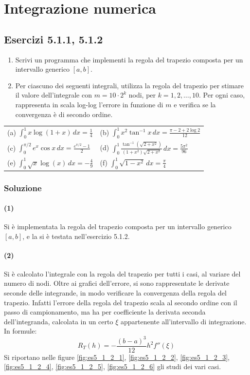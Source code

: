 \documentclass[letterpaper, 12pt]{article}
\numberwithin{equation}{section}    %
\begin{document}
\section{Integrazione numerica}
\subsection{Esercizi 5.1.1, 5.1.2}
\begin{enumerate}
    \item Scrivi un programma che implementi la regola del trapezio composta per un intervallo generico $[a,b]$.
    \item Per ciascuno dei seguenti integrali, utilizza la regola del trapezio per stimare il valore dell'integrale con $m=10\cdot 2^k$ nodi, per $k=1,2,\ldots,10$. Per ogni caso, rappresenta in scala log-log l'errore in funzione di $m$ e verifica se la convergenza è di secondo ordine.
\end{enumerate}

\begin{tabular}{@{}ll@{}}
(a) $\displaystyle \int_0^1 x\log(1+x)\, dx = \frac{1}{4}$
    & (b) $\displaystyle \int_0^1 x^2 \tan^{-1}x\, dx = \frac{\pi-2+2\log 2}{12}$ \\[1.5ex]
(c) $\displaystyle \int_0^{\pi/2}e^x \cos x\, dx = \frac{e^{\pi/2}-1}{2}$
    & (d) $\displaystyle \int_0^1 \frac{\tan^{-1}(\sqrt{2+x^2})}{(1+x^2)\sqrt{2+x^2}}\,dx = \frac{5\pi^2}{96}$ \\[1.5ex]
(e) $\displaystyle \int_0^1 \sqrt{x} \log(x) \, dx = -\frac{4}{9}$ 
    & (f) $\displaystyle \int_0^1 \sqrt{1-x^2}\, dx = \frac{\pi}{4}$ \\ [1.5ex]
\end{tabular}

\subsubsection{Soluzione}
\paragraph{(1)}Si è implementata la regola del trapezio composta per un intervallo generico $[a,b]$,
e la si è testata nell'esercizio 5.1.2.
\paragraph{(2)}Si è calcolato l'integrale con la regola del trapezio per tutti i casi, al variare del numero di
nodi. Oltre ai grafici dell'errore, si sono rappresentate le derivate seconde delle integrande,
in modo verificare la convergenza della regola del trapezio. Infatti l'errore della regola del trapezio 
scala al secondo ordine con il passo di campionamento,
ma ha per coefficiente la derivata seconda dell'integranda, calcolata in un certo $\xi$ appartenente all'intervallo
di integrazione. In formule:
\[
R_T(h) = -\frac{(b-a)^3 }{12}h^2 f''(\xi)
\]
Si riportano nelle figure \ref{fig:es5_1_2_1}, \ref{fig:es5_1_2_2}, \ref{fig:es5_1_2_3}, 
\ref{fig:es5_1_2_4}, \ref{fig:es5_1_2_5}, \ref{fig:es5_1_2_6} gli studi dei vari casi.
\end{document}
